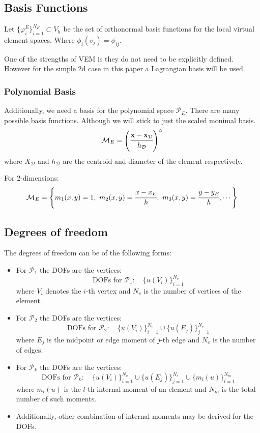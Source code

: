 \documentclass{report}
\begin{document}
\subsection{Basis Functions}
Let $\{\varphi_i^E\}_{i=1}^{N_E} \subset V_h$ be the set of orthonormal basis functions for the local virtual element spaces. Where $\phi_i(v_j) = \phi_{ij}.$

One of the strengths of VEM is they do not need to be explicitly defined. However for the simple 2d case in this paper a Lagrangian basis will be used.

\subsubsection{Polynomial Basis}
Additionally, we need a basis for the polynomial space $\mathcal{P}_E$. There are many possible basis functions. Although we will stick to just the scaled monimal basis.
\begin{equation}
    \mathcal{M}_E = \left(\cfrac{\mathbf{x} - \mathbf{x}_{\mathcal{D}}}{h_{\mathcal{D}}}\right)^{\alpha}
\end{equation}
where $X_{\mathcal{D}}$ and $h_{\mathcal{D}}$ are the centroid and diameter of the element respectively.

For 2-dimensions:
\begin{equation}
    \mathcal{M}_E = \left\{m_1(x,y) = 1,\ m_2(x,y) = \cfrac{x-x_E}{h},\ m_3(x,y) = \cfrac{y-y_E}{h}, \cdots\right\}
\end{equation}



\subsection{Degrees of freedom}
The degrees of freedom can be of the following forms:
\begin{itemize}
    \item For $\mathcal{P}_1$ the DOFs are the vertices:
    $$\text{DOFs for } \mathcal{P}_1: \quad \{ u(V_i) \}_{i=1}^{N_v}$$
    where $V_i$ denotes the $i$-th vertex and $N_v$ is the number of vertices of the element.
    
    \item For $\mathcal{P}_2$ the DOFs are the vertices:
    $$\text{DOFs for } \mathcal{P}_2: \quad \{ u(V_i) \}_{i=1}^{N_v} \cup \{ u(E_j) \}_{j=1}^{N_e}$$
    where $E_j$ is the midpoint or edge moment of $j$-th edge and $N_e$ is the number of edges.
    
    \item For $\mathcal{P}_k$ the DOFs are the vertices:
    $$\text{DOFs for } \mathcal{P}_k: \quad \{ u(V_i) \}_{i=1}^{N_v} \cup \{ u(E_j) \}_{j=1}^{N_e} \cup \{ m_l(u) \}_{l=1}^{N_m}$$
    where $m_l(u)$ is the $l$-th internal moment of an element and $N_m$ is the total number of such moments.

    \item Additionally, other combination of internal moments may be derived for the DOFs.    
\end{itemize}
\end{document}
